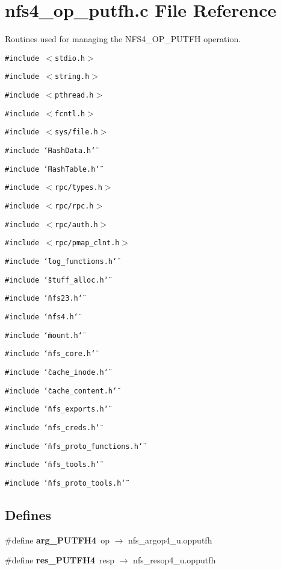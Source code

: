 \section{nfs4\_\-op\_\-putfh.c File Reference}
\label{nfs4__op__putfh_8c}
Routines used for managing the NFS4\_\-OP\_\-PUTFH operation. 

{\tt \#include $<$stdio.h$>$}\par
{\tt \#include $<$string.h$>$}\par
{\tt \#include $<$pthread.h$>$}\par
{\tt \#include $<$fcntl.h$>$}\par
{\tt \#include $<$sys/file.h$>$}\par
{\tt \#include \char`\"{}Hash\-Data.h\char`\"{}}\par
{\tt \#include \char`\"{}Hash\-Table.h\char`\"{}}\par
{\tt \#include $<$rpc/types.h$>$}\par
{\tt \#include $<$rpc/rpc.h$>$}\par
{\tt \#include $<$rpc/auth.h$>$}\par
{\tt \#include $<$rpc/pmap\_\-clnt.h$>$}\par
{\tt \#include \char`\"{}log\_\-functions.h\char`\"{}}\par
{\tt \#include \char`\"{}stuff\_\-alloc.h\char`\"{}}\par
{\tt \#include \char`\"{}nfs23.h\char`\"{}}\par
{\tt \#include \char`\"{}nfs4.h\char`\"{}}\par
{\tt \#include \char`\"{}mount.h\char`\"{}}\par
{\tt \#include \char`\"{}nfs\_\-core.h\char`\"{}}\par
{\tt \#include \char`\"{}cache\_\-inode.h\char`\"{}}\par
{\tt \#include \char`\"{}cache\_\-content.h\char`\"{}}\par
{\tt \#include \char`\"{}nfs\_\-exports.h\char`\"{}}\par
{\tt \#include \char`\"{}nfs\_\-creds.h\char`\"{}}\par
{\tt \#include \char`\"{}nfs\_\-proto\_\-functions.h\char`\"{}}\par
{\tt \#include \char`\"{}nfs\_\-tools.h\char`\"{}}\par
{\tt \#include \char`\"{}nfs\_\-proto\_\-tools.h\char`\"{}}\par
\subsection*{Defines}
\begin{CompactItemize}
\item 
\#define {\bf arg\_\-PUTFH4}\ op $\rightarrow$ nfs\_\-argop4\_\-u.opputfh
\item 
\#define {\bf res\_\-PUTFH4}\ resp $\rightarrow$ nfs\_\-resop4\_\-u.opputfh
\end{CompactItemize}
